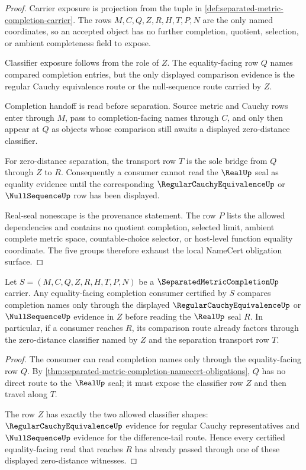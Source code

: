 \begin{proof}
Carrier exposure is projection from the tuple in \autoref{def:separated-metric-completion-carrier}. The rows $M,C,Q,Z,R,H,T,P,N$ are the only named coordinates, so an accepted object has no further completion, quotient, selection, or ambient completeness field to expose.

Classifier exposure follows from the role of $Z$. The equality-facing row $Q$ names compared completion entries, but the only displayed comparison evidence is the regular Cauchy equivalence route or the null-sequence route carried by $Z$.

Completion handoff is read before separation. Source metric and Cauchy rows enter through $M$, pass to completion-facing names through $C$, and only then appear at $Q$ as objects whose comparison still awaits a displayed zero-distance classifier.

For zero-distance separation, the transport row $T$ is the sole bridge from $Q$ through $Z$ to $R$. Consequently a consumer cannot read the $\RealUp$ seal as equality evidence until the corresponding $\RegularCauchyEquivalenceUp$ or $\NullSequenceUp$ row has been displayed.

Real-seal nonescape is the provenance statement. The row $P$ lists the allowed dependencies and contains no quotient completion, selected limit, ambient complete metric space, countable-choice selector, or host-level function equality coordinate. The five groups therefore exhaust the local NameCert obligation surface.
\end{proof}

\begin{theorem}
\label{thm:separated-metric-completion-zero-distance-classifier}
Let $S=(M,C,Q,Z,R,H,T,P,N)$ be a $\SeparatedMetricCompletionUp$ carrier. Any equality-facing completion consumer certified by $S$ compares completion names only through the displayed $\RegularCauchyEquivalenceUp$ or $\NullSequenceUp$ evidence in $Z$ before reading the $\RealUp$ seal $R$. In particular, if a consumer reaches $R$, its comparison route already factors through the zero-distance classifier named by $Z$ and the separation transport row $T$.
\end{theorem}
\begin{proof}
The consumer can read completion names only through the equality-facing row $Q$. By \autoref{thm:separated-metric-completion-namecert-obligations}, $Q$ has no direct route to the $\RealUp$ seal; it must expose the classifier row $Z$ and then travel along $T$.

The row $Z$ has exactly the two allowed classifier shapes: $\RegularCauchyEquivalenceUp$ evidence for regular Cauchy representatives and $\NullSequenceUp$ evidence for the difference-tail route. Hence every certified equality-facing read that reaches $R$ has already passed through one of these displayed zero-distance witnesses.
\end{proof}

